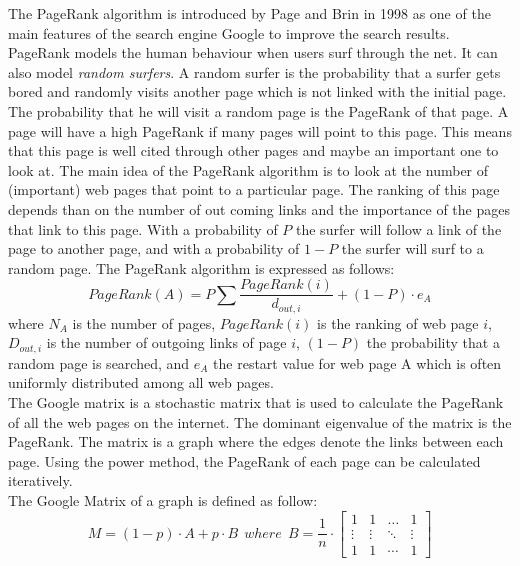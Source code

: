 The PageRank algorithm is introduced by Page and Brin in 1998 as one of the main features of the search engine Google to improve the search results. PageRank models the human behaviour when users surf through the net. It can also model \textit{random surfers}. A random surfer is the probability that a surfer gets bored and randomly visits another page which is not linked with the initial page. The probability that he will visit a random page is the PageRank of that page. A page will have a high PageRank if many pages will point to this page. This means that this page is well cited through other pages and maybe an important one to look at.    The main idea of the PageRank algorithm is to look at the number of (important) web pages that point to a particular page. The ranking of this page depends than on the number of out coming links and the importance of the pages that link to this page. With a probability of $P$ the surfer will follow a link of the page to another page, and with a probability of $1-P$ the surfer will surf to a random page. The PageRank algorithm is expressed as follows:
\begin{equation}
PageRank(A)=P \sum \dfrac{PageRank(i)}{d_{out,i}} + (1-P) \cdot e_{A}
\end{equation}
where $N_{A}$ is the number of pages, $PageRank(i)$ is the ranking of web page $i$, $D_{out,i}$ is the number of outgoing links of page $i$, $(1-P)$ the probability that a random page is searched, and $e_{A}$ the restart value for web page A which is often uniformly distributed among all web pages. \\

The Google matrix is a stochastic matrix that is used to calculate the PageRank of all the web pages on the internet. The dominant eigenvalue of the matrix is the PageRank. The matrix is a graph where the edges denote the links between each page. Using the power method, the PageRank of each page can be calculated iteratively. \\

The Google Matrix of a graph is defined as follow:
\begin{equation}
M = (1-p) \cdot A + p \cdot B ~~where~~B=\dfrac{1}{n}\cdot \begin{bmatrix}
       1 & 1 & \ldots &1           \\[0.3em]
       \vdots & \vdots          & \ddots & \vdots \\[0.3em]
       1 & 1& \cdots &1
     \end{bmatrix}
\end{equation}

